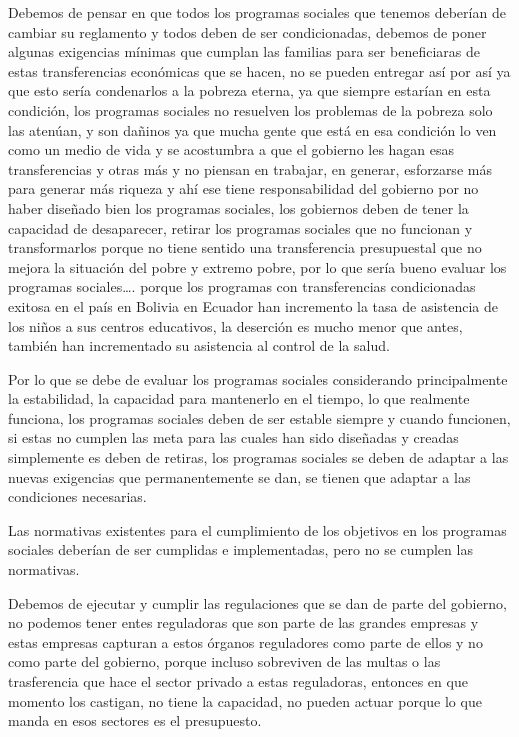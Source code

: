 \documentclass[
  a4paper,
]{article}
\begin{document}
Debemos de pensar en que todos los programas sociales que tenemos
deberían de cambiar su reglamento y todos deben de ser condicionadas,
debemos de poner algunas exigencias mínimas que cumplan las familias
para ser beneficiaras de estas transferencias económicas que se hacen,
no se pueden entregar así por así ya que esto sería condenarlos a la
pobreza eterna, ya que siempre estarían en esta condición, los programas
sociales no resuelven los problemas de la pobreza solo las atenúan, y
son dañinos ya que mucha gente que está en esa condición lo ven como un
medio de vida y se acostumbra a que el gobierno les hagan esas
transferencias y otras más y no piensan en trabajar, en generar,
esforzarse más para generar más riqueza y ahí ese tiene responsabilidad
del gobierno por no haber diseñado bien los programas sociales, los
gobiernos deben de tener la capacidad de desaparecer, retirar los
programas sociales que no funcionan y transformarlos porque no tiene
sentido una transferencia presupuestal que no mejora la situación del
pobre y extremo pobre, por lo que sería bueno evaluar los programas
sociales\ldots. porque los programas con transferencias condicionadas
exitosa en el país en Bolivia en Ecuador han incremento la tasa de
asistencia de los niños a sus centros educativos, la deserción es mucho
menor que antes, también han incrementado su asistencia al control de la
salud.

Por lo que se debe de evaluar los programas sociales considerando
principalmente la estabilidad, la capacidad para mantenerlo en el
tiempo, lo que realmente funciona, los programas sociales deben de ser
estable siempre y cuando funcionen, si estas no cumplen las meta para
las cuales han sido diseñadas y creadas simplemente es deben de retiras,
los programas sociales se deben de adaptar a las nuevas exigencias que
permanentemente se dan, se tienen que adaptar a las condiciones
necesarias.

Las normativas existentes para el cumplimiento de los objetivos en los
programas sociales deberían de ser cumplidas e implementadas, pero no se
cumplen las normativas.

Debemos de ejecutar y cumplir las regulaciones que se dan de parte del
gobierno, no podemos tener entes reguladoras que son parte de las
grandes empresas y estas empresas capturan a estos órganos reguladores
como parte de ellos y no como parte del gobierno, porque incluso
sobreviven de las multas o las trasferencia que hace el sector privado a
estas reguladoras, entonces en que momento los castigan, no tiene la
capacidad, no pueden actuar porque lo que manda en esos sectores es el
presupuesto.
\end{document}
